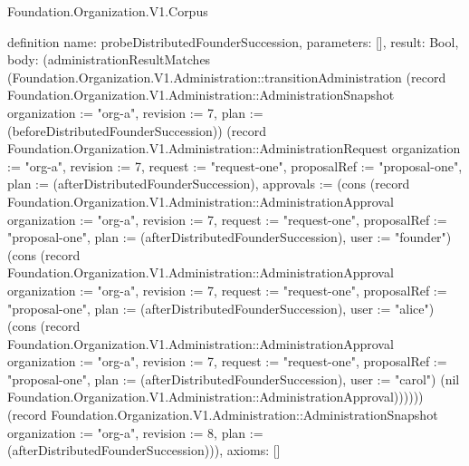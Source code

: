 \begin{lexlean}{Foundation.Organization.V1.Corpus}
\begin{semanticmodule}
definition{
  name: probeDistributedFounderSuccession,
  parameters: [],
  result: Bool,
  body: (administrationResultMatches (Foundation.Organization.V1.Administration::transitionAdministration (record Foundation.Organization.V1.Administration::AdministrationSnapshot {organization := "org-a", revision := 7, plan := (beforeDistributedFounderSuccession)}) (record Foundation.Organization.V1.Administration::AdministrationRequest {organization := "org-a", revision := 7, request := "request-one", proposalRef := "proposal-one", plan := (afterDistributedFounderSuccession), approvals := (cons (record Foundation.Organization.V1.Administration::AdministrationApproval {organization := "org-a", revision := 7, request := "request-one", proposalRef := "proposal-one", plan := (afterDistributedFounderSuccession), user := "founder"}) (cons (record Foundation.Organization.V1.Administration::AdministrationApproval {organization := "org-a", revision := 7, request := "request-one", proposalRef := "proposal-one", plan := (afterDistributedFounderSuccession), user := "alice"}) (cons (record Foundation.Organization.V1.Administration::AdministrationApproval {organization := "org-a", revision := 7, request := "request-one", proposalRef := "proposal-one", plan := (afterDistributedFounderSuccession), user := "carol"}) (nil Foundation.Organization.V1.Administration::AdministrationApproval))))})) (record Foundation.Organization.V1.Administration::AdministrationSnapshot {organization := "org-a", revision := 8, plan := (afterDistributedFounderSuccession)})),
  axioms: []
}


\end{semanticmodule}
\end{lexlean}
